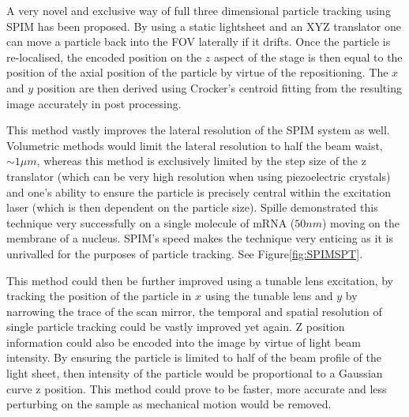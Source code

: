 A very novel and exclusive way of full three dimensional particle tracking using SPIM has been proposed.
By using a static lightsheet and an XYZ translator one can move a particle back into the FOV laterally if it drifts.
Once the particle is re-localised, the encoded position on the \(z\) aspect of the stage is then equal to the position of the axial position of the particle by virtue of the repositioning.
The \(x\) and \(y\) position are then derived using Crocker's centroid fitting from the resulting image accurately in post processing.

This method vastly improves the lateral resolution of the SPIM system as well.
Volumetric methods would limit the lateral resolution to half the beam waist, \(\sim 1 \mu m\), whereas this method is exclusively limited by the step size of the z translator (which can be very high resolution when using piezoelectric crystals) and one's ability to ensure the particle is precisely central within the excitation laser (which is then dependent on the particle size).
Spille demonstrated this technique very successfully on a single molecule of mRNA (\(50 nm\)\cite{Spille2015a}) moving on the membrane of a nucleus\cite{Spille2015a}.
SPIM's speed makes the technique very enticing as it is unrivalled for the purposes of particle tracking.
See Figure\ref{fig:SPIMSPT}.

This method could then be further improved using a tunable lens excitation, by tracking the position of the particle in \(x\) using the tunable lens and \(y\) by narrowing the trace of the scan mirror, the temporal and spatial resolution of single particle tracking could be vastly improved yet again.
Z position information could also be encoded into the image by virtue of light beam intensity.
By ensuring the particle is limited to half of the beam profile of the light sheet, then intensity of the particle would be proportional to a Gaussian curve z position.
This method could prove to be faster, more accurate and less perturbing on the sample as mechanical motion would be removed.

